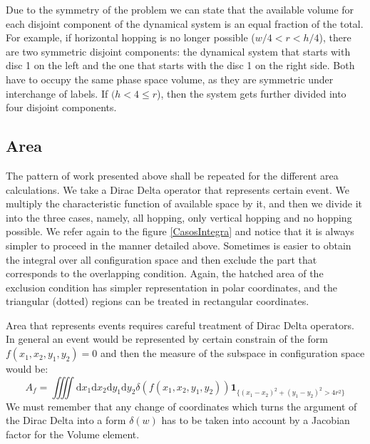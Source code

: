 \documentclass[letterpaper,10pt, jcp, aps]{revtex4-1}
\newcommand{\rd}{\!\mathrm{d}}
\newcommand{\indicator}[1]{\mathbf{1}_{ \{   #1 \} } }
\begin{document}
Due to the symmetry of the problem we can state that the available volume
for each disjoint component of the dynamical system is an equal fraction
of the total. For example, if horizontal hopping is no longer possible
($w/4<r<h/4$), there are two symmetric disjoint components: the dynamical system
that starts with disc 1 on the left and the one that starts with the disc 1 on
the right side. Both have to occupy the same phase space volume, as they are
symmetric under interchange of labels. If $(h<4\leq r$), then the system gets further
divided into four disjoint components. 



\subsection{Area}

The pattern of work presented above shall be repeated for the different
area calculations. We take a Dirac Delta operator that represents certain
event. We multiply the characteristic function of available space by it, and
then we divide it into the three cases, namely, all hopping, only vertical hopping
and no hopping possible. We refer again to the figure \ref{CasosIntegra} and notice
that it is always simpler to proceed in the manner detailed above. Sometimes is
easier to obtain 
the integral  over all configuration space and then exclude the part that
corresponds to the overlapping condition. Again, the hatched area of the exclusion
condition has simpler representation in polar coordinates, and the triangular
(dotted) regions can be treated in rectangular coordinates.



Area that represents events  requires careful treatment of Dirac Delta operators.
In general an event would be represented by certain constrain of the form
$f(x_1, x_2 , y_1,y_2) =0 $ and then the measure of the subspace in configuration
space would be:
\begin{equation}
  A_f=\iiiint \rd x_1  \rd x_2  \rd y_1  \rd y_2 \delta(f(x_1, x_2 , y_1,y_2))
  \indicator{(x_1-x_2)^2+(y_1-y_2)^2>4r^2 }
\end{equation}
We must remember that any change of coordinates which turns the argument
of the Dirac Delta into a form $\delta(w)$ has to be taken into account by
a Jacobian factor for the Volume element. 
\end{document}
